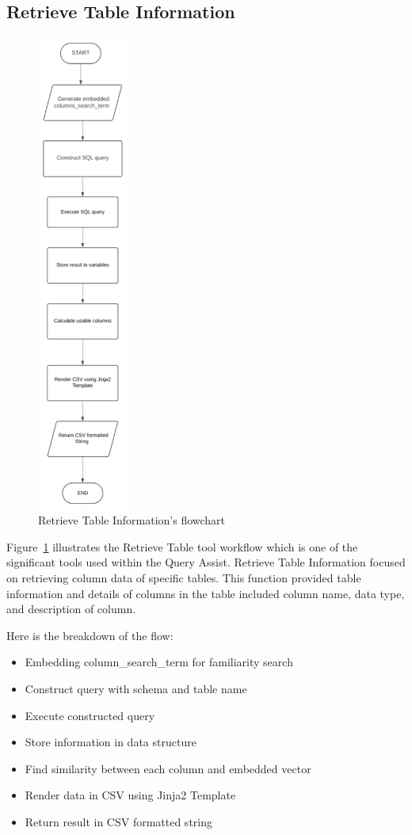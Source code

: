     \subsection{Retrieve Table Information}
    \label{sec:retrieve_table_info}
    \begin{figure}[H]
        \centering
        \includegraphics[width=3cm]{chapters/3/figures/retrieve_table_info.png}
        \caption[Retrieve Table Information's flowchart]{Retrieve Table Information's flowchart}
        \label{fig:retrieve_table_info}
    \end{figure}
    Figure~\ref{fig:retrieve_table_info} illustrates the  Retrieve Table tool workflow which is one of the significant tools used within the Query Assist. Retrieve Table Information focused on retrieving column data of specific tables. This function provided table information and details of columns in the table included column name, data type, and description of column.

    Here is the breakdown of the flow:
    \begin{itemize}
        \item  Embedding column\_search\_term for familiarity search
        \item  Construct query with schema and table name
        \item  Execute constructed query
        \item  Store information in data structure
        \item  Find similarity between each column and embedded vector
        \item  Render data in CSV using Jinja2 Template
        \item  Return result in CSV formatted string
    \end{itemize}

